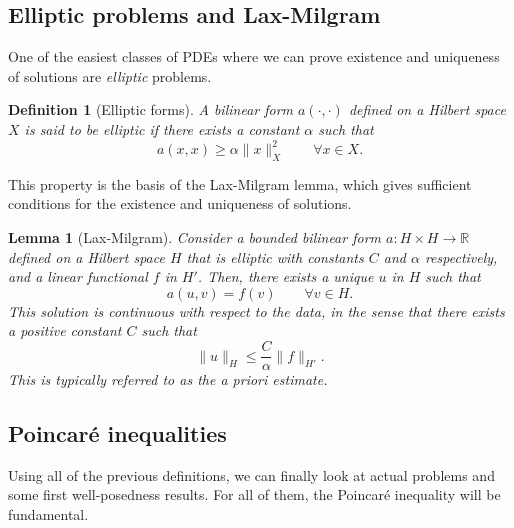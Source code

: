 \documentclass{article}
\newtheorem{definition}{Definition}
\newcommand{\R}{\mathbb{R}}
\newtheorem{lemma}{Lemma}
\begin{document}
\subsection{Elliptic problems and Lax-Milgram}
One of the easiest classes of PDEs where we can prove existence and uniqueness of solutions are \textit{elliptic} problems. 
\begin{definition}[Elliptic forms]
    A bilinear form $a(\cdot, \cdot)$ defined on a Hilbert space $X$ is said to be elliptic if there exists a constant $\alpha$ such that
        $$ a(x, x) \geq \alpha \| x \|^2_X \qquad \forall x\in X. $$
\end{definition}
This property is the basis of the Lax-Milgram lemma, which gives sufficient conditions for the existence and uniqueness of solutions. 
\begin{lemma}[Lax-Milgram] Consider a bounded bilinear form $a: H\times H\to \R$ defined on a Hilbert space $H$ that is elliptic with constants $C$ and $\alpha$ respectively, and a linear functional $f$ in $H'$. Then, there exists a unique $u$ in $H$ such that 
    $$ a(u, v) = f(v) \qquad \forall v \in H. $$
This solution is continuous with respect to the data, in the sense that there exists a positive constant $C$ such that 
    $$ \| u\|_H \leq \frac C \alpha \| f \|_{H'} .$$
This is typically referred to as the \emph{a priori} estimate. 
\end{lemma}

\subsection{Poincaré inequalities}
Using all of the previous definitions, we can finally look at actual problems and some first well-posedness results. For all of them, the Poincaré inequality will be fundamental.
\end{document}
